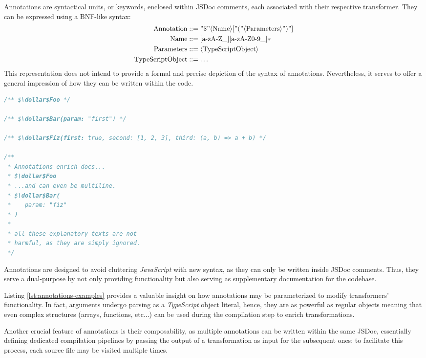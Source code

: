 Annotations are syntactical units, or keywords, enclosed within JSDoc comments,
each associated with their respective transformer.
They can be expressed using a BNF-like syntax:
\begin{equation*}
\begin{aligned}
    \text{Annotation} & ::= "\$" \langle \text{Name} \rangle [ "(" \langle \text{Parameters} \rangle ")" ] \\
    \text{Name} & ::= [\text{a-zA-Z\_}][\text{a-zA-Z0-9\_}]* \\
    \text{Parameters} & ::= \langle \text{TypeScriptObject} \rangle \\
    \text{TypeScriptObject} & ::= \dots \\
\end{aligned}
\end{equation*}
This representation does not intend to provide a formal and precise depiction of the syntax of annotations.
Nevertheless, it serves to offer a general impression of how they can be written within the code.
\begin{lstlisting}[language=javascript, caption={Generic examples of annotation.}, label={lst:annotations-examples}]
/** $\dollar$Foo */

/** $\dollar$Bar(param: "first") */

/** $\dollar$Fiz(first: true, second: [1, 2, 3], third: (a, b) => a + b) */

/**
 * Annotations enrich docs...
 * $\dollar$Foo
 * ...and can even be multiline.
 * $\dollar$Bar(
 *    param: "fiz"
 * )
 *
 * all these explanatory texts are not 
 * harmful, as they are simply ignored.
 */
\end{lstlisting}

Annotations are designed to avoid cluttering \textit{JavaScript} with new syntax,
as they can only be written inside JSDoc comments.
Thus, they serve a dual-purpose by not only providing functionality
but also serving as supplementary documentation for the codebase.

Listing \ref{lst:annotations-examples} provides a valuable insight on how annotations
may be parameterized to modify transformers' functionality.
In fact, arguments undergo parsing as a \textit{TypeScript} object literal,
hence, they are as powerful as regular objects\cite{mdn_objects}
meaning that even complex structures (arrays, functions, etc...) can be used
during the compilation step to enrich transformations.

Another crucial feature of annotations is their composability,
as multiple annotations can be written within the same JSDoc,
essentially defining dedicated compilation pipelines by passing the output
of a transformation as input for the subsequent ones:
to facilitate this process, each source file may be visited multiple times.

